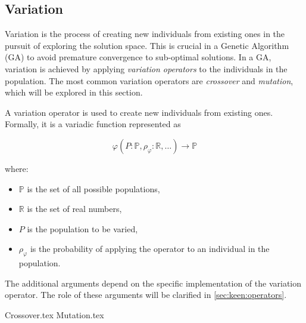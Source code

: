 
\subsection{Variation}
\label{sec:genetic_algorithms:variation}
  Variation is the process of creating new individuals from existing ones in the pursuit of exploring the solution 
  space. This is crucial in a Genetic Algorithm (GA) to avoid premature convergence to sub-optimal solutions.
  In a GA, variation is achieved by applying \emph{variation operators} to the 
  individuals in the population.
  The most common variation operators are \emph{crossover} and \emph{mutation}, 
  which will be explored in this section.

  \begin{definition}
    \label{def:variation_operator}
    A variation operator is used to create new individuals from existing ones.
    Formally, it is a variadic function represented as 
    
    \[
      \varphi(P: \mathbb{P}, \rho_\varphi: \mathbb{R}, \dots) \to \mathbb{P}
    \]
    
    where:

    \begin{itemize} 
      \item \(\mathbb{P}\) is the set of all possible populations,
      \item \(\mathbb{R}\) is the set of real numbers,
      \item \(P\) is the population to be varied,
      \item \(\rho_\varphi\) is the probability of applying the operator to an 
        individual in the population.
    \end{itemize}

    The additional arguments depend on the specific implementation of the 
    variation operator.
    The role of these arguments will be clarified in \vref{sec:keen:operators}.
  \end{definition}

  {Crossover.tex}
  {Mutation.tex}

